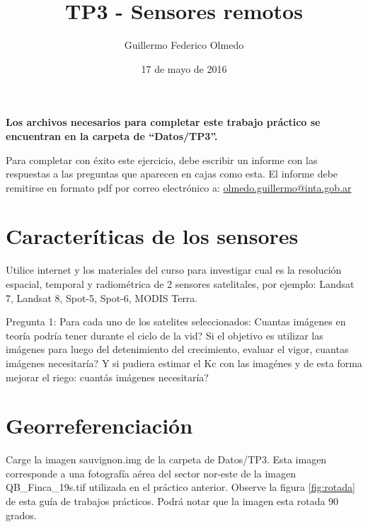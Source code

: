 \documentclass[onecolumn]{article}
\title{TP3 - Sensores remotos}
\author{Guillermo Federico Olmedo}
\date{17 de mayo de 2016}
\begin{document}

\maketitle

\tableofcontents
\bigskip

\textbf{Los archivos necesarios para completar este trabajo práctico se encuentran en la carpeta de “Datos/TP3”. }\\

\begin{mdframed}
	Para completar con éxito este ejercicio, debe escribir un informe con las respuestas a las preguntas que aparecen en cajas como esta. El informe debe remitirse en formato pdf por correo electrónico a: \url{olmedo.guillermo@inta.gob.ar}
\end{mdframed}

\section{Caracteríticas de los sensores}

Utilice internet y los materiales del curso para investigar cual es la resolución espacial, temporal y radiométrica de 2 sensores satelitales, por ejemplo: Landsat 7, Landsat 8, Spot-5, Spot-6, MODIS Terra.

\begin{mdframed}[]
	Pregunta 1: Para cada uno de los satelites seleccionados: Cuantas imágenes en teoría podría tener durante el ciclo de la vid? Si el objetivo es utilizar las imágenes para luego del detenimiento del crecimiento, evaluar el vigor, cuantas imágenes necesitaría? Y si pudiera estimar el Kc con las imagénes y de esta forma mejorar el riego: cuantás imágenes necesitaría?
\end{mdframed}

\section{Georreferenciación}

Carge la imagen sauvignon.img de la carpeta de Datos/TP3. Esta imagen corresponde a una fotografía aérea del sector nor-este de la imagen QB\_Finca\_19s.tif utilizada en el práctico anterior. Observe la figura \ref{fig:rotada} de esta guía de trabajos prácticos. Podrá notar que la imagen esta rotada 90 grados. \\
\end{document}
